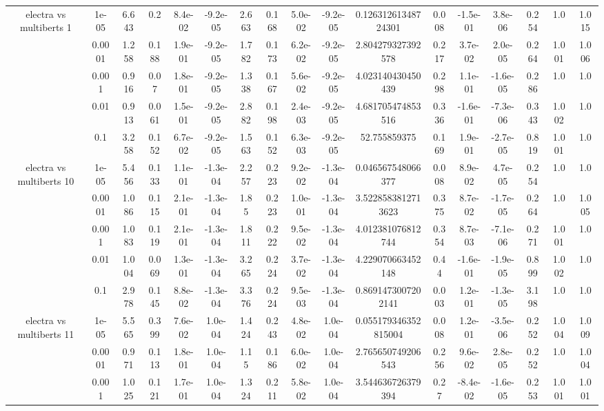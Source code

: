 \begin{tabular}{|c|c|c|c|c|c|c|c|c|c|c|c|c|c|c|c|c|}
\hline
\multirow{5}{*}{electra  vs multiberts 1} & 1e-05 & 6.643 & 0.2 & 8.4e-02 & -9.2e-05 & 2.663 & 0.168 & 5.0e-02 & -9.2e-05 & 0.12631261348724301 & 0.008 & -1.5e-01 & 3.8e-06 & 0.254 & 1.0 & 1.015 \\
 & 0.0001 & 1.258 & 0.188 & 1.9e-01 & -9.2e-05 & 1.782 & 0.173 & 6.2e-02 & -9.2e-05 & 2.804279327392578 & 0.217 & 3.7e-02 & 2.0e-05 & 0.264 & 1.001 & 1.006 \\
 & 0.001 & 0.916 & 0.07 & 1.8e-01 & -9.2e-05 & 1.338 & 0.167 & 5.6e-02 & -9.2e-05 & 4.023140430450439 & 0.298 & 1.1e-01 & -1.6e-05 & 0.286 & 1.0 & 1.0 \\
 & 0.01 & 0.913 & 0.061 & 1.5e-01 & -9.2e-05 & 2.882 & 0.198 & 2.4e-03 & -9.2e-05 & 4.681705474853516 & 0.336 & -1.6e-01 & -7.3e-06 & 0.343 & 1.002 & 1.0 \\
 & 0.1 & 3.258 & 0.152 & 6.7e-02 & -9.2e-05 & 1.563 & 0.152 & 6.3e-03 & -9.2e-05 & 52.755859375 & 0.169 & 1.9e-01 & -2.7e-05 & 0.819 & 1.001 & 1.0 \\
\hline
\multirow{5}{*}{electra  vs multiberts 10} & 1e-05 & 5.456 & 0.133 & 1.1e-01 & -1.3e-04 & 2.257 & 0.223 & 9.2e-02 & -1.3e-04 & 0.046567548066377 & 0.008 & 8.9e-02 & 4.7e-05 & 0.254 & 1.0 & 1.0 \\
 & 0.0001 & 1.086 & 0.115 & 2.1e-01 & -1.3e-04 & 1.85 & 0.223 & 1.0e-01 & -1.3e-04 & 3.5228583812713623 & 0.375 & 8.7e-02 & -1.7e-05 & 0.264 & 1.0 & 1.005 \\
 & 0.001 & 1.083 & 0.119 & 2.1e-01 & -1.3e-04 & 1.811 & 0.222 & 9.5e-02 & -1.3e-04 & 4.012381076812744 & 0.354 & 8.7e-03 & -7.1e-06 & 0.271 & 1.001 & 1.0 \\
 & 0.01 & 1.004 & 0.069 & 1.3e-01 & -1.3e-04 & 3.265 & 0.224 & 3.7e-02 & -1.3e-04 & 4.229070663452148 & 0.44 & -1.6e-01 & -1.9e-05 & 0.899 & 1.002 & 1.0 \\
 & 0.1 & 2.978 & 0.145 & 8.8e-02 & -1.3e-04 & 3.376 & 0.224 & 9.5e-03 & -1.3e-04 & 0.8691473007202141 & 0.003 & 1.2e-01 & -1.3e-05 & 3.198 & 1.0 & 1.0 \\
\hline
\multirow{5}{*}{electra  vs multiberts 11} & 1e-05 & 5.565 & 0.399 & 7.6e-02 & 1.0e-04 & 1.424 & 0.243 & 4.8e-02 & 1.0e-04 & 0.055179346352815004 & 0.008 & 1.2e-01 & -3.5e-06 & 0.252 & 1.004 & 1.009 \\
 & 0.0001 & 0.971 & 0.113 & 1.8e-01 & 1.0e-04 & 1.15 & 0.186 & 6.0e-02 & 1.0e-04 & 2.765650749206543 & 0.256 & 9.6e-02 & 2.8e-05 & 0.252 & 1.0 & 1.004 \\
 & 0.001 & 1.025 & 0.121 & 1.7e-01 & 1.0e-04 & 1.324 & 0.211 & 5.8e-02 & 1.0e-04 & 3.544636726379394 & 0.27 & -8.4e-02 & -1.6e-05 & 0.253 & 1.001 & 1.001 \\

\end{tabular}
